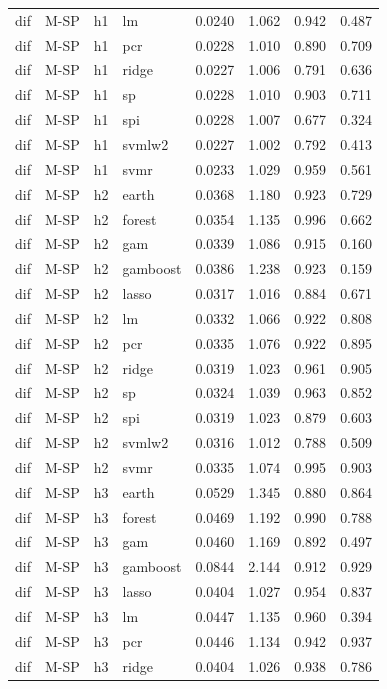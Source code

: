 \begin{ThreePartTable}
\begin{longtable}[t]{llclcccc}
dif & M-SP & h1 & lm & 0.0240 & 1.062 & 0.942 & 0.487\\
dif & M-SP & h1 & pcr & 0.0228 & 1.010 & 0.890 & 0.709\\
dif & M-SP & h1 & ridge & 0.0227 & 1.006 & 0.791 & 0.636\\
dif & M-SP & h1 & sp & 0.0228 & 1.010 & 0.903 & 0.711\\
dif & M-SP & h1 & spi & 0.0228 & 1.007 & 0.677 & 0.324\\
dif & M-SP & h1 & svmlw2 & 0.0227 & 1.002 & 0.792 & 0.413\\
dif & M-SP & h1 & svmr & 0.0233 & 1.029 & 0.959 & 0.561\\
\addlinespace
dif & M-SP & h2 & earth & 0.0368 & 1.180 & 0.923 & 0.729\\
dif & M-SP & h2 & forest & 0.0354 & 1.135 & 0.996 & 0.662\\
dif & M-SP & h2 & gam & 0.0339 & 1.086 & 0.915 & 0.160\\
dif & M-SP & h2 & gamboost & 0.0386 & 1.238 & 0.923 & 0.159\\
dif & M-SP & h2 & lasso & 0.0317 & 1.016 & 0.884 & 0.671\\
dif & M-SP & h2 & lm & 0.0332 & 1.066 & 0.922 & 0.808\\
dif & M-SP & h2 & pcr & 0.0335 & 1.076 & 0.922 & 0.895\\
dif & M-SP & h2 & ridge & 0.0319 & 1.023 & 0.961 & 0.905\\
dif & M-SP & h2 & sp & 0.0324 & 1.039 & 0.963 & 0.852\\
dif & M-SP & h2 & spi & 0.0319 & 1.023 & 0.879 & 0.603\\
dif & M-SP & h2 & svmlw2 & 0.0316 & 1.012 & 0.788 & 0.509\\
dif & M-SP & h2 & svmr & 0.0335 & 1.074 & 0.995 & 0.903\\
\addlinespace
dif & M-SP & h3 & earth & 0.0529 & 1.345 & 0.880 & 0.864\\
dif & M-SP & h3 & forest & 0.0469 & 1.192 & 0.990 & 0.788\\
dif & M-SP & h3 & gam & 0.0460 & 1.169 & 0.892 & 0.497\\
dif & M-SP & h3 & gamboost & 0.0844 & 2.144 & 0.912 & 0.929\\
dif & M-SP & h3 & lasso & 0.0404 & 1.027 & 0.954 & 0.837\\
dif & M-SP & h3 & lm & 0.0447 & 1.135 & 0.960 & 0.394\\
dif & M-SP & h3 & pcr & 0.0446 & 1.134 & 0.942 & 0.937\\
dif & M-SP & h3 & ridge & 0.0404 & 1.026 & 0.938 & 0.786\\

\end{longtable}
\end{ThreePartTable}

